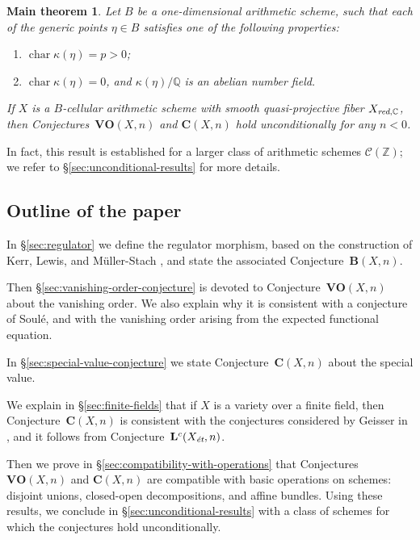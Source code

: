\documentclass[10pt,a4paper,oneside]{article}
\DeclareMathOperator{\fchar}{char}
\newcommand{\CC}{\mathbb{C}}
\newcommand{\QQ}{\mathbb{Q}}
\newcommand{\ZZ}{\mathbb{Z}}
\newcommand{\et}{\text{\it \'{e}t}}
\newcommand{\red}{\text{\it red}}
\theoremstyle{myplain}
\newtheorem*{maintheorem*}{Main theorem}
\theoremstyle{mydefinition}
\numberwithin{equation}{section}
\begin{document}
\begin{maintheorem*}
  Let $B$ be a one-dimensional arithmetic scheme, such that each of the generic
  points $\eta \in B$ satisfies one of the following properties:
  \begin{enumerate}
  \item[a)] $\fchar \kappa (\eta) = p > 0$;

  \item[b)] $\fchar \kappa (\eta) = 0$, and $\kappa (\eta)/\QQ$ is an abelian
    number field.
  \end{enumerate}
  If $X$ is a $B$-cellular arithmetic scheme with smooth quasi-projective fiber
  $X_{\red,\CC}$, then Conjectures~$\mathbf{VO} (X,n)$ and
  $\mathbf{C} (X,n)$ hold unconditionally for any $n < 0$.
\end{maintheorem*}

In fact, this result is established for a larger class of arithmetic schemes
$\mathcal{C} (\ZZ)$; we refer to \S\ref{sec:unconditional-results} for more
details.

\subsection*{Outline of the paper}

In \S\ref{sec:regulator} we define the regulator morphism, based on the
construction of Kerr, Lewis, and M\"{u}ller-Stach
\cite{Kerr-Lewis-Muller-Stach-2006}, and state the associated
Conjecture~$\mathbf{B} (X,n)$.

Then \S\ref{sec:vanishing-order-conjecture} is devoted to
Conjecture~$\mathbf{VO} (X,n)$ about the vanishing order. We also explain why it
is consistent with a conjecture of Soul\'{e}, and with the vanishing order
arising from the expected functional equation.

In \S\ref{sec:special-value-conjecture} we state Conjecture~$\mathbf{C} (X,n)$
about the special value.

We explain in \S\ref{sec:finite-fields} that if $X$ is a variety over a finite
field, then Conjecture~$\mathbf{C} (X,n)$ is consistent with the conjectures
considered by Geisser in
\cite{Geisser-2004,Geisser-2006,Geisser-2010-arithmetic-homology}, and it
follows from Conjecture~$\mathbf{L}^c (X_\et,n)$.

Then we prove in \S\ref{sec:compatibility-with-operations} that Conjectures
$\mathbf{VO} (X,n)$ and $\mathbf{C} (X,n)$ are compatible with basic operations
on schemes: disjoint unions, closed-open decompositions, and affine
bundles. Using these results, we conclude in \S\ref{sec:unconditional-results}
with a class of schemes for which the conjectures hold unconditionally.
\end{document}
